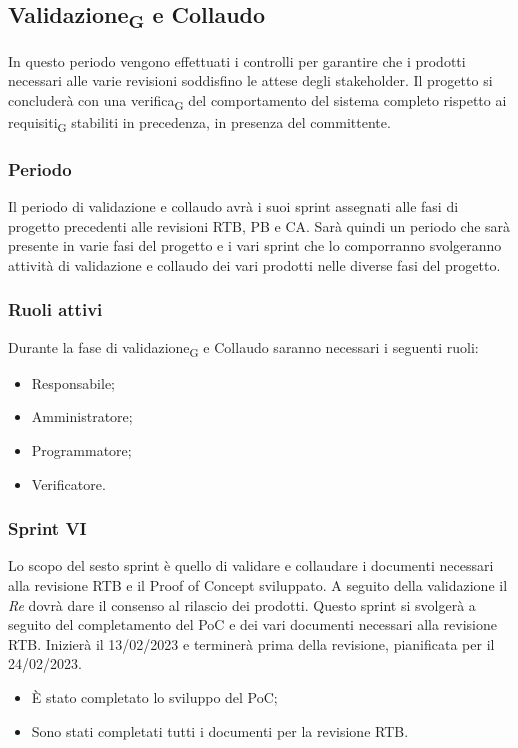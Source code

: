 \newpage
\subsection{Validazione\textsubscript{G} e Collaudo}
In questo periodo vengono effettuati i controlli per garantire che i prodotti necessari alle varie revisioni soddisfino le attese degli stakeholder. Il progetto si concluderà con una verifica\textsubscript{G} del comportamento del sistema completo rispetto ai requisiti\textsubscript{G} stabiliti in precedenza, in presenza del committente.

\subsubsection{Periodo}
Il periodo di validazione e collaudo avrà i suoi sprint assegnati alle fasi di progetto precedenti alle revisioni RTB, PB e CA. Sarà quindi un periodo che sarà presente in varie fasi del progetto e i vari sprint che lo comporranno svolgeranno attività di validazione e collaudo dei vari prodotti nelle diverse fasi del progetto.

\subsubsection{Ruoli attivi}
Durante la fase di validazione\textsubscript{G} e Collaudo saranno necessari i seguenti ruoli:
\begin{itemize}
	\item Responsabile;
	\item Amministratore;
	\item Programmatore;
	\item Verificatore.
\end{itemize}

\subsubsection{Sprint VI}
Lo scopo del sesto sprint è quello di validare e collaudare i documenti necessari alla revisione RTB e il Proof of Concept sviluppato. A seguito della validazione il \textit{Re} dovrà dare il consenso al rilascio dei prodotti.
Questo sprint si svolgerà a seguito del completamento del PoC e dei vari documenti necessari alla revisione RTB. Inizierà il 13/02/2023 e terminerà prima della revisione, pianificata per il 24/02/2023.

\:
\begin{itemize}
	\item È stato completato lo sviluppo del PoC;
	\item Sono stati completati tutti i documenti per la revisione RTB.
\end{itemize}

